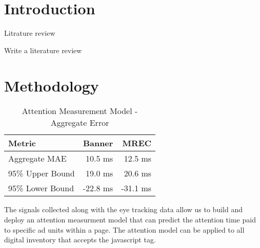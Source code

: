 \documentclass[sigconf]{acmart}
\begin{document}


\maketitle

\section{Introduction}

Litrature review

Write a literature review \cite{Vazhayil2018}
\cite{Canali2011}
\cite{Ayes2019}
\cite{Mamun2016}
\cite{Li2020}
\cite{Basnet2012}
\cite{Basnet2014}
\cite{Tupsamudre2019}
\cite{Le2018}
\cite{Baykan2009}
\cite{Kan2005}
\cite{Hernandez2012}
\cite{Chung2022}
\cite{Qiu2020}
\cite{Vaishnavi2021}
\cite{Xu2021}
\cite{Rhea2022}


\section{Methodology}


\begin{table}
  \caption{Attention Measurement Model - Aggregate Error}
  \label{tab:atm}
\begin{tabular}{|l|r|r|}
\toprule
Metric                  &Banner       &MREC       \\
\midrule
Aggregate MAE           &10.5 ms      &12.5 ms    \\
95\% Upper Bound        &19.0 ms      &20.6 ms    \\
95\% Lower Bound        &-22.8 ms     &-31.1 ms   \\
  \bottomrule
\end{tabular}
\end{table}

The signals collected along with the eye tracking data allow us to build and deploy an
attention measurment model that can predict the attention time paid to
specific ad units within a page. The attention model can
be applied to all digital inventory that accepts the javascript tag.
\end{document}
